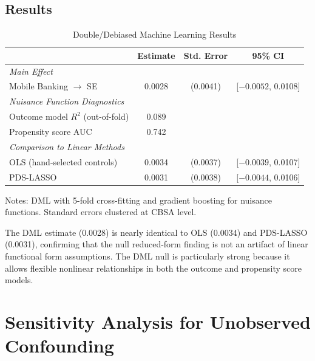 \documentclass[12pt]{article}
\begin{document}
\subsection{Results}

\begin{table}[H]
\centering
\caption{Double/Debiased Machine Learning Results}
\label{tab:dml_results}
\begin{threeparttable}
\begin{tabular}{lccc}
\toprule
& Estimate & Std. Error & 95\% CI \\
\midrule
\multicolumn{4}{l}{\textit{Main Effect}} \\
Mobile Banking $\rightarrow$ SE & 0.0028 & (0.0041) & [$-0.0052$, 0.0108] \\
\midrule
\multicolumn{4}{l}{\textit{Nuisance Function Diagnostics}} \\
Outcome model $R^2$ (out-of-fold) & 0.089 & & \\
Propensity score AUC & 0.742 & & \\
\midrule
\multicolumn{4}{l}{\textit{Comparison to Linear Methods}} \\
OLS (hand-selected controls) & 0.0034 & (0.0037) & [$-0.0039$, 0.0107] \\
PDS-LASSO & 0.0031 & (0.0038) & [$-0.0044$, 0.0106] \\
\bottomrule
\end{tabular}
\begin{tablenotes}
\small
\item Notes: DML with 5-fold cross-fitting and gradient boosting for nuisance functions. Standard errors clustered at CBSA level.
\end{tablenotes}
\end{threeparttable}
\end{table}

The DML estimate (0.0028) is nearly identical to OLS (0.0034) and PDS-LASSO (0.0031), confirming that the null reduced-form finding is not an artifact of linear functional form assumptions. The DML null is particularly strong because it allows flexible nonlinear relationships in both the outcome and propensity score models.

\section{Sensitivity Analysis for Unobserved Confounding}
\label{app:sensitivity}
\end{document}
